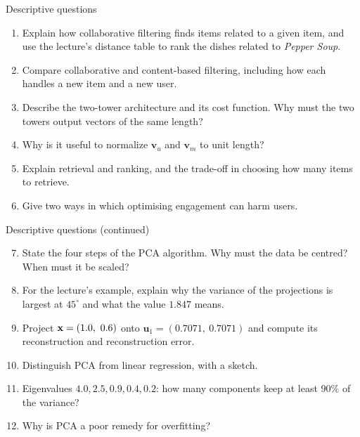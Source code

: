 \documentclass[aspectratio=169,10pt]{beamer}
\begin{document}
\begin{frame}{Descriptive questions}
  \footnotesize
  \begin{enumerate}
    \item Explain how collaborative filtering finds items related to a given item, and
          use the lecture's distance table to rank the dishes related to \emph{Pepper
          Soup}. \hfill{}
    \item Compare collaborative and content-based filtering, including how each handles
          a new item and a new user. \hfill{}
    \item Describe the two-tower architecture and its cost function. Why must the two
          towers output vectors of the same length? \hfill{}
    \item Why is it useful to normalize $\mathbf{v}_u$ and $\mathbf{v}_m$ to unit length?
          \hfill{}
    \item Explain retrieval and ranking, and the trade-off in choosing how many items to
          retrieve. \hfill{}
    \item Give two ways in which optimising engagement can harm users. \hfill{}
  \end{enumerate}
\end{frame}

\begin{frame}{Descriptive questions (continued)}
  \footnotesize
  \begin{enumerate}\setcounter{enumi}{6}
    \item State the four steps of the PCA algorithm. Why must the data be centred? When
          must it be scaled? \hfill{}
    \item For the lecture's example, explain why the variance of the projections is
          largest at $45^\circ$ and what the value $1.847$ means. \hfill{}
    \item Project $\mathbf{x} = (1.0,\ 0.6)$ onto $\mathbf{u}_1 = (0.7071,\ 0.7071)$ and compute its
          reconstruction and reconstruction error. \hfill{}
    \item Distinguish PCA from linear regression, with a sketch. \hfill{}
    \item Eigenvalues $4.0, 2.5, 0.9, 0.4, 0.2$: how many components keep at least $90\%$
          of the variance? \hfill{}
    \item Why is PCA a poor remedy for overfitting? \hfill{}
  \end{enumerate}
\end{frame}
\end{document}
